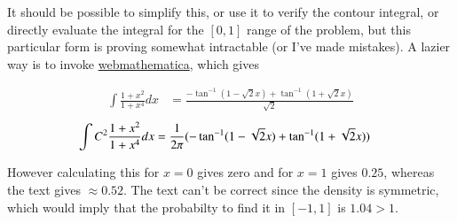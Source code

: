 \documentclass{article}
\begin{document}

%

%


It should be possible to simplify this, or use it to verify the contour integral, or directly evaluate the integral for the $[0,1]$ range of the problem,
but this particular form is proving somewhat intractable (or I've made mistakes).  A lazier way is to invoke \href{http://integrals.wolfram.com/index.jsp}{webmathematica}, which gives

\begin{align*}
\int \frac{1 + x^2}{1 + x^4} dx &=
\frac{-\tan^{-1}(1 - \sqrt{2} x) + \tan^{-1}(1 + \sqrt{2} x)}{ \sqrt{2} }
\end{align*}
\begin{align*}
\int C^2 \frac{1 + x^2}{1 + x^4} dx &=
\frac{1}{2 \pi} (-\tan^{-1}(1 - \sqrt{2} x) + \tan^{-1}(1 + \sqrt{2} x))
\end{align*}

However calculating this for $x=0$ gives zero and for $x=1$ gives $0.25$, whereas the text gives $\approx 0.52$.  The text can't be correct since the density is symmetric, which would imply that the probabilty to find it in $[-1,1]$ is $1.04 > 1$.




\end{document}
